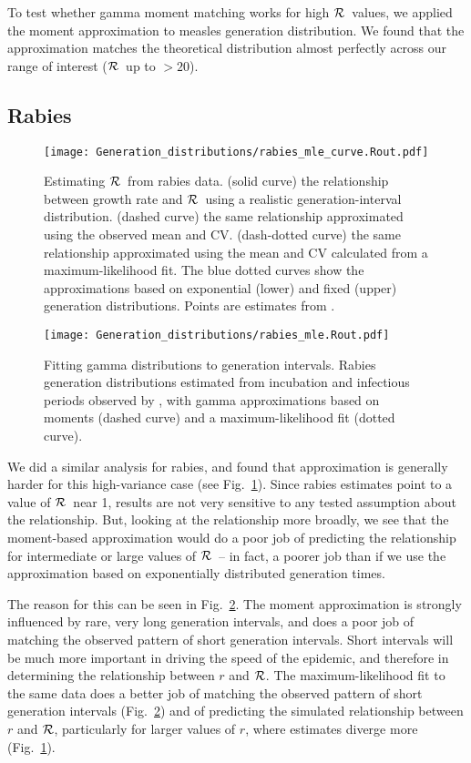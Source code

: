 \documentclass[12pt,]{article}
\newcommand{\RR}{\ensuremath{{\cal R}}}
\newcommand{\fref}[1]{Fig.~\ref{fig:#1}}
\begin{document}
To test whether gamma moment matching works for high \RR\ values, we applied the moment approximation to measles generation distribution. We found that the approximation matches the theoretical distribution almost perfectly across our range of interest (\RR\ up to $>20$).

\subsection{Rabies}

\begin{figure}[htbp] \centering
	\texttt{[image: Generation\_distributions/rabies\_mle\_curve.Rout.pdf]}
	\caption{Estimating \RR~from rabies data.
		(solid curve) the relationship between growth rate and \RR~using a realistic generation-interval distribution.
		(dashed curve) the same relationship approximated using the observed mean and CV.
		(dash-dotted curve) the same relationship approximated using the mean and CV calculated from a maximum-likelihood fit.
		The blue dotted curves show the approximations based on exponential (lower) and fixed (upper) generation distributions.
		Points are estimates from \cite{HampDush09}.
	}
	\label{fig:rabiesCurve}
\end{figure}

\begin{figure}[htbp] \centering
	\texttt{[image: Generation\_distributions/rabies\_mle.Rout.pdf]}
	\caption{
		Fitting gamma distributions to generation intervals. 
		Rabies generation distributions estimated from incubation and infectious periods observed by \cite{HampDush09}, with gamma approximations based on moments (dashed curve) and a maximum-likelihood fit (dotted curve).
	}
	\label{fig:rabiesHist}
\end{figure}

We did a similar analysis for rabies, and found that approximation is generally harder for this high-variance case (see \fref{rabiesCurve}). Since rabies estimates point to a value of \RR\ near 1, results are not very sensitive to any tested assumption about the relationship. But, looking at the relationship more broadly, we see that the moment-based approximation would do a poor job of predicting the relationship for intermediate or large values of \RR\ -- in fact, a poorer job than if we use the approximation based on exponentially distributed generation times. 

The reason for this can be seen in \fref{rabiesHist}. The moment approximation is strongly influenced by rare, very long generation intervals, and does a poor job of matching the observed pattern of short generation intervals. Short intervals will be much more important in driving the speed of the epidemic, and therefore in determining the relationship between $r$ and \RR. The maximum-likelihood fit to the same data does a better job of matching the observed pattern of short generation intervals (\fref{rabiesHist}) and of predicting the simulated relationship between $r$ and \RR, particularly for larger values of $r$, where estimates diverge more (\fref{rabiesCurve}).
\end{document}
